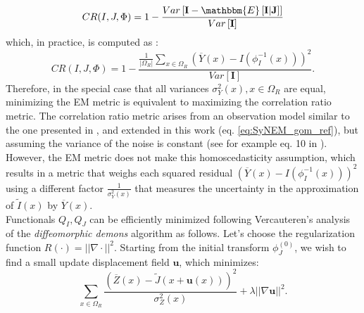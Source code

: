\begin{equation}
    CR(I, J, \Phi) = 1 - \frac{Var\left[ \mathbf{I} - \mathbbm{E}\left[ \mathbf{I} | \mathbf{J}\right] \right]}{Var\left[ \mathbf{I} \right]}
\end{equation}
which, in practice, is computed as \citep[see][eq. 4]{Roche1998}:
\begin{equation}
    CR(I, J, \Phi) = 1 - \frac{\frac{1}{|\Omega_{R}|}\sum_{x \in \Omega_{R}} \left(\overline{Y}(x) - I(\phi_{I}^{-1}(x))\right)^{2}}{Var\left[ \mathbf{I} \right]}.
\end{equation}
Therefore, in the special case that all variances $\sigma^{2}_{Y}(x), x\in\Omega_{R}$ are equal, minimizing the EM metric is equivalent to maximizing the correlation ratio metric. The correlation ratio metric arises from an observation model similar to the one presented in \cite{Arce-santana2014}, and extended in this work (eq. \eqref{eq:SyNEM_gom_ref}), but assuming the variance of the noise is constant (see for example eq. 10 in \citep{Roche2000}). However, the EM metric does not make this homoscedasticity assumption, which results in a metric that weighs each squared residual $\left(\overline{Y}(x) - I(\phi_{I}^{-1}(x))\right)^{2}$ using a different factor $\frac{1}{\sigma^{2}_{Y}(x)}$ that measures the uncertainty in the approximation of $\tilde{I}(x)$ by $\overline{Y}(x)$.\\

Functionals $Q_{I}, Q_{J}$ can be efficiently minimized following Vercauteren's analysis of the \textit{diffeomorphic demons} algorithm \citep{Vercauteren2009} as follows.
Let's choose the regularization function $R(\cdot) = ||\nabla \cdot||^{2}$. Starting from the initial transform $\phi^{(0)}_{J}$, we wish to find a small update displacement field $\mathbf{u}$, which minimizes:
\begin{equation}\label{eq:vercauteren_cost}
    \sum_{x \in \Omega_{R}} \frac{\left(\overline{Z}(x) - \tilde{J}(x + \mathbf{u}(x))\right)^{2}}{\sigma^{2}_{Z}(x)} + \lambda ||\nabla \mathbf{u}||^{2}.
\end{equation}

